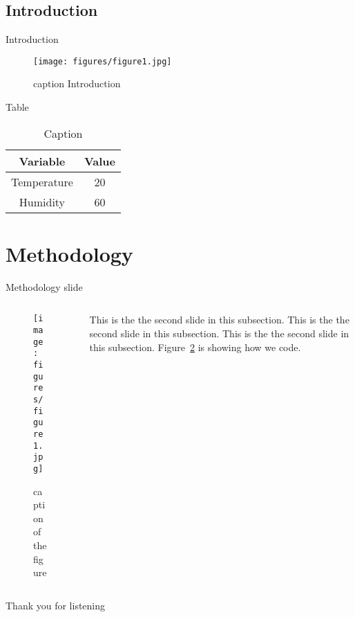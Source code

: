 \documentclass[aspectratio=169]{beamer}
\begin{document}
\subsection{Introduction}

\begin{frame}{Introduction}
    \begin{figure}
        \texttt{[image: figures/figure1.jpg]}\\
        \caption{caption Introduction}
        \label{fig:figureIntroduction}
    \end{figure}
\end{frame}

\begin{frame}{Table}
    \begin{table}[]
        \centering
        \begin{tabular}{c|c}
            Variable & Value \\
            \hline
            Temperature & 20 \\
            Humidity & 60
        \end{tabular}
        \caption{Caption}
        \label{tab:my_label}
    \end{table}
\end{frame}

\section{Methodology}

\begin{frame}{Methodology slide}
    \begin{columns}
        \begin{column}{0.65\textwidth}
            \begin{figure}
                \texttt{[image: figures/figure1.jpg]}\\
                \caption{caption of the figure}
                \label{fig:figure1}
            \end{figure}
        \end{column}
        \begin{column}{0.35\textwidth}
            This is the the second slide in this subsection.
            This is the the second slide in this subsection.
            This is the the second slide in this subsection.
            Figure~\ref{fig:figure1} is showing how we code.
        \end{column}
    \end{columns}
\end{frame}

\begin{frame}{}
Thank you for listening
\end{frame}
\end{document}
